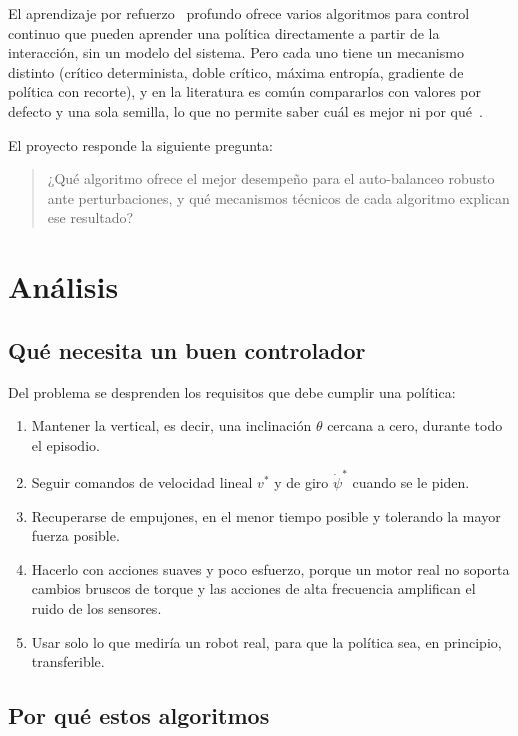\documentclass[11pt,a4paper]{article}
\begin{document}
El aprendizaje por refuerzo~\cite{sutton2018} profundo ofrece varios algoritmos para control continuo que pueden aprender una política directamente a partir de la interacción, sin un modelo del sistema. Pero cada uno tiene un mecanismo distinto (crítico determinista, doble crítico, máxima entropía, gradiente de política con recorte), y en la literatura es común compararlos con valores por defecto y una sola semilla, lo que no permite saber cuál es mejor ni por qué~\cite{henderson2018,agarwal2021}.

El proyecto responde la siguiente pregunta:
\begin{quote}
¿Qué algoritmo ofrece el mejor desempeño para el auto-balanceo robusto ante perturbaciones, y qué mecanismos técnicos de cada algoritmo explican ese resultado?
\end{quote}

\section{Análisis}

\subsection{Qué necesita un buen controlador}

Del problema se desprenden los requisitos que debe cumplir una política:
\begin{enumerate}
  \item Mantener la vertical, es decir, una inclinación $\theta$ cercana a cero, durante todo el episodio.
  \item Seguir comandos de velocidad lineal $v^*$ y de giro $\dot\psi^*$ cuando se le piden.
  \item Recuperarse de empujones, en el menor tiempo posible y tolerando la mayor fuerza posible.
  \item Hacerlo con acciones suaves y poco esfuerzo, porque un motor real no soporta cambios bruscos de torque y las acciones de alta frecuencia amplifican el ruido de los sensores.
  \item Usar solo lo que mediría un robot real, para que la política sea, en principio, transferible.
\end{enumerate}

\subsection{Por qué estos algoritmos}
\end{document}
